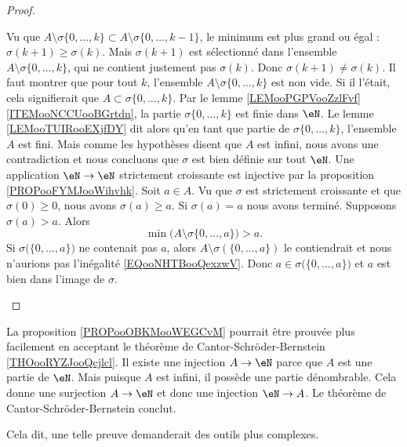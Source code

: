 \begin{proof}
\begin{subproof}
		Vu que \( A\setminus\sigma\{ 0,\ldots, k \}\subset A\setminus\sigma\{ 0,\ldots, k-1 \}\), le minimum est plus grand ou égal : \( \sigma(k+1)\geq \sigma(k)\). Mais \( \sigma(k+1)\) est sélectionné dans l'ensemble \( A\setminus\sigma\{ 0,\ldots, k \}\), qui ne contient justement pas \( \sigma(k)\). Donc \( \sigma(k+1)\neq \sigma(k)\).
		Il faut montrer que pour tout \( k\), l'ensemble \( A\setminus\sigma\{ 0,\ldots, k \}\) est non vide. Si il l'était, cela signifierait que \( A\subset \sigma\{ 0,\ldots, k \}\). Par le lemme \ref{LEMooPGPVooZzlFvf}\ref{ITEMooNCCUooBGrtdn}, la partie \( \sigma\{ 0,\ldots, k \}\) est finie dans \( \eN\). Le lemme \ref{LEMooTUIRooEXjfDY} dit alors qu'en tant que partie de \( \sigma\{ 0,\ldots, k \}\), l'ensemble \( A\) est fini. Mais comme les hypothèses disent que \( A\) est infini, nous avons une contradiction et nous concluons que \( \sigma\) est bien définie sur tout \( \eN\).
		Une application \( \eN\to \eN\) strictement croissante est injective par la proposition \ref{PROPooFYMJooWihvhk}.
		Soit \( a\in A\). Vu que \( \sigma\) est strictement croissante et que \( \sigma(0)\geq 0\), nous avons \( \sigma(a)\geq a\). Si \( \sigma(a)=a\) nous avons terminé. Supposons \( \sigma(a)>a\). Alors
		\begin{equation}        \label{EQooNHTBooQexzwV}
			\min\big( A\setminus\sigma\{ 0,\ldots, a \} \big)>a.
		\end{equation}
		Si \( \sigma\big( \{ 0,\ldots, a \} \big)\) ne contenait pas \( a\), alors \( A\setminus \sigma(\{ 0,\ldots, a \})\) le contiendrait et nous n'aurions pas l'inégalité \eqref{EQooNHTBooQexzwV}. Donc \( a\in \sigma\big( \{ 0,\ldots, a \} \big)\) et \( a\) est bien dans l'image de \( \sigma\).
	\end{subproof}
\end{proof}

\begin{normaltext}
	La proposition \ref{PROPooOBKMooWEGCvM} pourrait être prouvée plus facilement en acceptant le théorème de Cantor-Schröder-Bernstein \ref{THOooRYZJooQcjlcl}. Il existe une injection \( A\to \eN\) parce que \( A\) est une partie de \( \eN\). Mais puisque \( A\) est infini, il possède une partie dénombrable. Cela donne une surjection \( A\to \eN\) et donc une injection \( \eN\to A\). Le théorème de Cantor-Schröder-Bernstein conclut.

	Cela dit, une telle preuve demanderait des outils plus complexes.
\end{normaltext}


